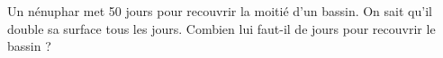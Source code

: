 Un nénuphar met 50 jours pour recouvrir la moitié d'un bassin. On
sait qu'il double sa surface tous les jours. Combien lui faut-il de
jours pour recouvrir le bassin ?